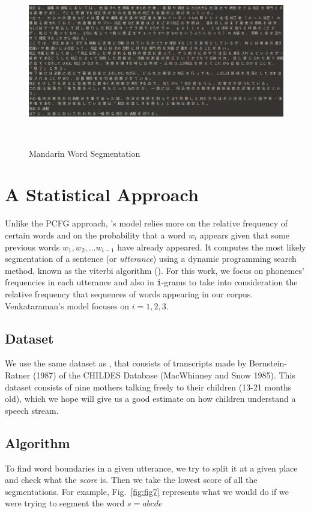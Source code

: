 \documentclass{article}
\begin{document}
\begin{figure}[h!]
  \centering
  \includegraphics[width=\columnwidth]{figures/mandarin_data.png}
  \caption{Mandarin Word Segmentation}~\label{fig:figure6}
\end{figure}
\section{A Statistical Approach}

Unlike the PCFG approach, \citet{Venkataraman}'s model relies more on the relative frequency of certain words and on the probability that a word $w_i$ appears given that some previous words $w_1, w_2, \dots w_{i-1}$ have already appeared. It computes the most likely segmentation of a sentence (or \textit{utterance}) using a dynamic programming search method, known as the viterbi algorithm (\citet{viterbi}). For this work, we focus on phonemes' frequencies in each utterance and also in \texttt{i}-grams to take into consideration the relative frequency that sequences of words appearing in our corpus. Venkataraman's model focuses on $i= 1, 2, 3$.
\subsection{Dataset}
We use the same dataset as \citet{Brent}, that consists of transcripts made by Bernstein-Ratner (1987) of the CHILDES Database (MacWhinney and Snow 1985). This dataset consists of nine mothers talking freely to their children (13-21 months old), which we hope will give us a good estimate on how children understand a speech stream. 

\subsection{Algorithm}
To find word boundaries in a given utterance, we try to split it at a given place and check what the \textit{score} is. Then we take the lowest score of all the segmentations.  For example, Fig.~\ref{fig:fig7} represents what we would do if we were trying to segment the word $s = abcde$
\end{document}
